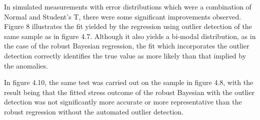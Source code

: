 In simulated measurements with error distributions which were a combination of Normal and Student's T, there were some significant improvements observed. Figure 8 illustrates the fit yielded by the regression using outlier detection of the same sample as in figure 4.7. Although it also yields a bi-modal distribution, as in the case of the robust Bayesian regression, the fit which incorporates the outlier detection correctly identifies the true value as more likely than that implied by the anomalies.

In figure 4.10, the same test was carried out on the sample in figure 4.8, with the result being that the fitted stress outcome of the robust Bayesian with the outlier detection was not significantly more accurate or more representative than the robust regression without the automated outlier detection. 



